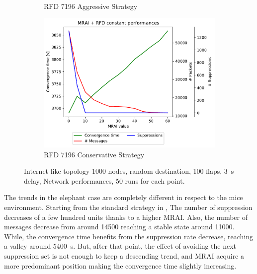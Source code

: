 \begin{figure}[h]
\begin{subfigure}[b]{0.49\textwidth}
         \caption{RFD 7196 Aggressive Strategy}
         \label{fig:1000_7196RFDA_multiMRAI_elephants}
     \end{subfigure}
     \begin{subfigure}[b]{0.49\textwidth}
         \centering
         \includegraphics[width=\textwidth]{images/RFD/miceVSelephants/MultiMRAI/elephants/cisco_1000_RFD_7196_conservative-constant_mrai_rfd_evolution.pdf}
         \caption{RFD 7196 Conservative Strategy}
         \label{fig:1000_7196RFDC_multiMRAI_elephants}
     \end{subfigure}
		\caption{Internet like topology \num{1000} nodes, random destination,
				\num{100} flaps, \SI{3}{\second} delay, Network performances,
				\num{50} runs for each point.}
        \label{fig:1000_RFD_multiMRAI_elephants}
\end{figure}

The trends in the elephant case are completely different in respect to the
mice environment.
Starting from the standard strategy in ,
The number of suppression decreases of a few hundred units
thanks to a higher \ac{MRAI}.
Also, the number of messages decrease from around \num{14500} reaching a stable
state around \num{11000}.
While, the convergence time benefits from the suppression rate decrease, reaching
a valley around \SI{5400}{\second}.
But, after that point, the effect of avoiding the next suppression set is not enough to keep
a descending trend, and \ac{MRAI} acquire a more predominant position making
the convergence time slightly increasing.

